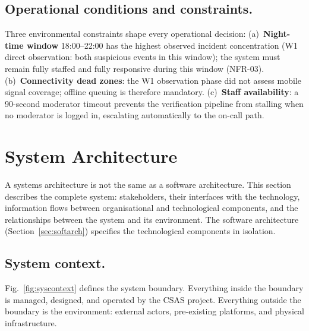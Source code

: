 \documentclass[12pt,a4paper]{article}
\begin{document}
\subsection{Operational conditions and constraints.}
Three environmental constraints shape every operational decision:
(a)~\textbf{Night-time window} 18:00--22:00 has the highest observed
incident concentration (W1 direct observation: both suspicious events
in this window); the system must remain fully staffed and fully
responsive during this window (NFR-03).
(b)~\textbf{Connectivity dead zones}: the W1 observation phase did not
assess mobile signal coverage; offline queuing is therefore mandatory.
(c)~\textbf{Staff availability}: a 90-second moderator timeout prevents
the verification pipeline from stalling when no moderator is logged
in, escalating automatically to the on-call path.

\section{System Architecture}
\label{sec:sysarch}

A systems architecture is not the same as a software architecture.
This section describes the complete system: stakeholders, their
interfaces with the technology, information flows between
organisational and technological components, and the relationships
between the system and its environment. The software architecture
(Section~\ref{sec:softarch}) specifies the technological components
in isolation.

\subsection{System context.}
Fig.~\ref{fig:syscontext} defines the system boundary. Everything
inside the boundary is managed, designed, and operated by the CSAS
project. Everything outside the boundary is the environment: external
actors, pre-existing platforms, and physical infrastructure.
\end{document}
